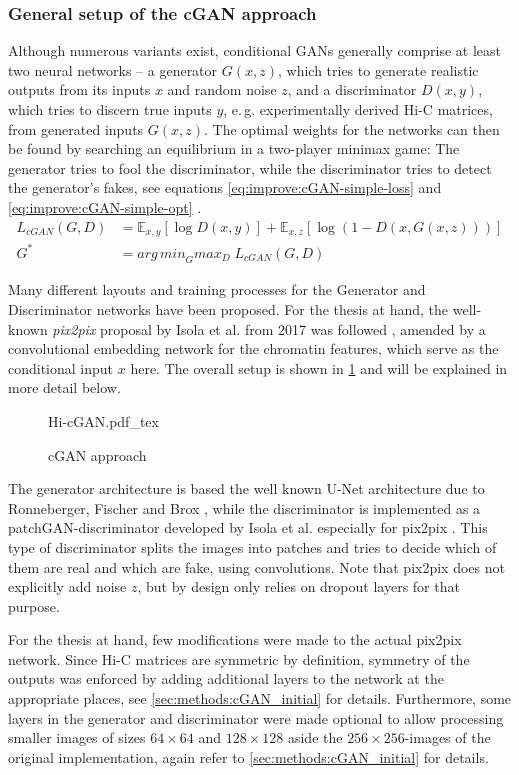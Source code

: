 \subsubsection{General setup of the cGAN approach}
Although numerous variants exist, conditional GANs generally comprise at least two neural networks -- 
a generator $G(x,z)$, which tries to generate realistic outputs from its inputs $x$ and random noise $z$, and a discriminator $D(x,y)$,
which tries to discern true inputs $y$, e.\,g. experimentally derived Hi-C matrices, from generated inputs $G(x,z)$.
The optimal weights for the networks can then be found by searching an equilibrium in a two-player minimax game:
The generator tries to fool the discriminator, while the discriminator tries to detect the generator's fakes, 
see equations \ref{eq:improve:cGAN-simple-loss} and \ref{eq:improve:cGAN-simple-opt} \cite{Isola2017}.
\begin{align}
 L_\mathit{cGAN}(G, D) &= \mathbb{E}_{x,y}[\log D(x,y)] + \mathbb{E}_{x,z}[\log(1-D(x, G(x,z)))] \label{eq:improve:cGAN-simple-loss} \\
 G^* &=  \mathit{arg\,min}_G \mathit{max}_D \; L_\mathit{cGAN}(G, D) \label{eq:improve:cGAN-simple-opt}
\end{align}

Many different layouts and training processes for the Generator and Discriminator networks have been proposed.
For the thesis at hand, the well-known \emph{pix2pix} proposal by Isola et al. from 2017 was followed \cite{Isola2017}, 
amended by a convolutional embedding network for the chromatin features, which serve as the conditional input $x$ here.
The overall setup is shown in \cref{fig:improve:cGAN-approach} and will be explained in more detail below.
\begin{figure}[htbp]
 {Hi-cGAN.pdf_tex}
 \caption{cGAN approach} \label{fig:improve:cGAN-approach}
\end{figure}
The generator architecture is based the well known U-Net architecture due to Ronneberger, Fischer and Brox \cite{Ronneberger2015},
while the discriminator is implemented as a patchGAN-discriminator developed by Isola et al. especially for pix2pix \cite{Isola2017}.
This type of discriminator splits the images into patches and tries to decide which of them are real and which are fake, using convolutions.
Note that pix2pix does not explicitly add noise $z$, but by design only relies on dropout layers for that purpose. 

For the thesis at hand, few modifications were made to the actual pix2pix network.
Since Hi-C matrices are symmetric by definition, symmetry of the outputs was enforced
by adding additional layers to the network at the appropriate places, see \cref{sec:methods:cGAN_initial} for details.
Furthermore, some layers in the generator and discriminator were made optional to allow processing smaller images of sizes $64\times64$
and $128\times128$ aside the $256\times256$-images of the original implementation, again refer to \cref{sec:methods:cGAN_initial} for details.

